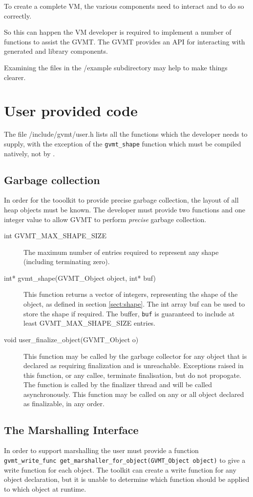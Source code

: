 
To create a complete VM, the various components need to interact and to do so correctly.

So this can happen the VM developer is required to implement a number of functions to assist the GVMT. 
The GVMT provides an API for interacting with generated and library components.

Examining the files in the /example subdirectory may help to make things clearer.

\section{User provided code}

The file /include/gvmt/user.h lists all the functions which the developer needs to supply, with the exception of the \verb|gvmt_shape| function which must be compiled natively, not by \gvmtc.

\subsection{Garbage collection\label{sect:user-shape}}
In order for the tooolkit to provide precise garbage collection, the layout of all heap objects must be known. The developer must provide two functions and one integer value to allow GVMT to perform \emph{precise} garbage collection.
\begin{description}
\item [int GVMT\_MAX\_SHAPE\_SIZE] The maximum number of entries required to represent any shape (including terminating zero).
\item [int* gvmt\_shape(GVMT\_Object object, int* buf)] This function returns a vector of integers, representing the shape of the object, as defined in section \ref{sect:shape}. The int array buf can be used to store the shape if required. The buffer, \verb|buf| is guaranteed to include at least GVMT\_MAX\_SHAPE\_SIZE entries.
\item [void user\_finalize\_object(GVMT\_Object o)] This function may be called by the garbage collector for any object that is declared as requiring finalization and is unreachable. Exceptions raised in this function, or any callee, terminate finalisation, but do not propogate. The function is called by the finalizer thread and will be called asynchronously. This function may be called on any or all object declared as finalizable, in any order. 
\end{description}


\subsection{The Marshalling Interface}
In order to support marshalling the user must provide a function \\
\verb|gvmt_write_func get_marshaller_for_object(GVMT_Object object)| to give a write function for each object. The toolkit can create a write function for any object declaration, but it is unable to determine which function should be applied to which object at runtime. 

